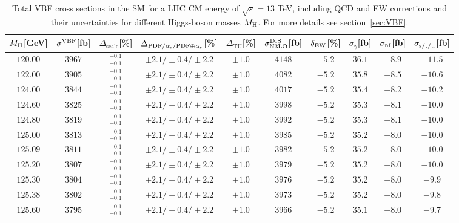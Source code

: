 \begin{table}[ht!]
\caption{Total VBF cross sections in the SM for a LHC CM energy of $\sqrt{s}=13$ TeV, including QCD and EW corrections
and their uncertainties for different Higgs-boson masses $M_\mathrm{H}$. For more details see section~\ref{sec:VBF}.}
\label{tab:vbf_XStot_13}
\begin{center}%
\begin{small}%
\begin{tabular}{cccccccc|cc}%
\toprule
$M_\mathrm{H}$[GeV] & $\sigma^{\mathrm{VBF}}$[fb] & $\Delta_{\mathrm{scale}}$[\%] & $\Delta_{\mathrm{PDF}/\alpha_{\mathrm{s}}/\mathrm{PDF\oplus\alpha_{\mathrm{s}}}}$[\%] & $\Delta_{\mathrm{TU}}$[\%] &
$\sigma_{\mathrm{N3LO}}^{\mathrm{DIS}}$[fb] & $\delta_{\mathrm{EW}}$[\%] & $\sigma_{\gamma}$[fb] & $\sigma_{\mbox{\scriptsize nf}}$[fb] & $\sigma_{\mbox{\scriptsize s/t/u}}$[fb]
\\
\midrule
$120.00$ & $3967$ & $^{+0.1}_{-0.1}$ & $\pm 2.1/\pm 0.4/\pm 2.2$ & $\pm 1.0$ & $4148$ & $-5.2$ & $36.1 $ & $-8.9$ & $-11.5$ \\
$122.00$ & $3905$ & $^{+0.1}_{-0.1}$ & $\pm 2.1/\pm 0.4/\pm 2.2$ & $\pm 1.0$ & $4082$ & $-5.2$ & $35.8 $ & $-8.5$ & $-10.6$ \\
$124.00$ & $3844$ & $^{+0.1}_{-0.1}$ & $\pm 2.1/\pm 0.4/\pm 2.2$ & $\pm 1.0$ & $4017$ & $-5.2$ & $35.4 $ & $-8.2$ & $-10.2$ \\
$124.60$ & $3825$ & $^{+0.1}_{-0.1}$ & $\pm 2.1/\pm 0.4/\pm 2.2$ & $\pm 1.0$ & $3998$ & $-5.2$ & $35.3 $ & $-8.1$ & $-10.0$ \\
$124.80$ & $3819$ & $^{+0.1}_{-0.1}$ & $\pm 2.1/\pm 0.4/\pm 2.2$ & $\pm 1.0$ & $3992$ & $-5.2$ & $35.3 $ & $-8.1$ & $-10.0$ \\
$125.00$ & $3813$ & $^{+0.1}_{-0.1}$ & $\pm 2.1/\pm 0.4/\pm 2.2$ & $\pm 1.0$ & $3985$ & $-5.2$ & $35.2 $ & $-8.0$ & $-10.0$ \\
$125.09$ & $3811$ & $^{+0.1}_{-0.1}$ & $\pm 2.1/\pm 0.4/\pm 2.2$ & $\pm 1.0$ & $3982$ & $-5.2$ & $35.2 $ & $-8.0$ & $-10.0$ \\
$125.20$ & $3807$ & $^{+0.1}_{-0.1}$ & $\pm 2.1/\pm 0.4/\pm 2.2$ & $\pm 1.0$ & $3979$ & $-5.2$ & $35.2 $ & $-8.0$ & $-10.0$ \\
$125.30$ & $3804$ & $^{+0.1}_{-0.1}$ & $\pm 2.1/\pm 0.4/\pm 2.2$ & $\pm 1.0$ & $3976$ & $-5.2$ & $35.2 $ & $-8.0$ & $-9.9 $ \\
$125.38$ & $3802$ & $^{+0.1}_{-0.1}$ & $\pm 2.1/\pm 0.4/\pm 2.2$ & $\pm 1.0$ & $3973$ & $-5.2$ & $35.2 $ & $-8.0$ & $-9.8 $ \\
$125.60$ & $3795$ & $^{+0.1}_{-0.1}$ & $\pm 2.1/\pm 0.4/\pm 2.2$ & $\pm 1.0$ & $3966$ & $-5.2$ & $35.1 $ & $-8.0$ & $-9.7 $ \\

\end{tabular}
\end{small}
\end{center}
\end{table}
